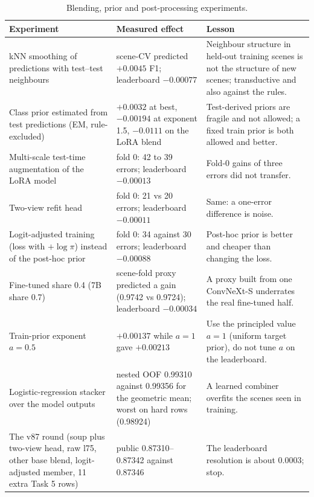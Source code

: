 \documentclass[../main.tex]{subfiles}
\begin{document}
\begin{table}[H]\centering\footnotesize
\begin{tabular}{@{}L{.22\linewidth}L{.36\linewidth}L{.34\linewidth}@{}}
\toprule
\textbf{Experiment} & \textbf{Measured effect} & \textbf{Lesson} \\
\midrule
kNN smoothing of predictions with test--test neighbours & scene-CV predicted $+0.0045$ F1; leaderboard $-0.00077$ & Neighbour structure in held-out training scenes is not the structure of new scenes; transductive and also against the rules. \\
Class prior estimated from test predictions (EM, rule-excluded) & $+0.0032$ at best, $-0.00194$ at exponent 1.5, $-0.0111$ on the LoRA blend & Test-derived priors are fragile and not allowed; a fixed train prior is both allowed and better. \\
Multi-scale test-time augmentation of the LoRA model & fold 0: 42 to 39 errors; leaderboard $-0.00013$ & Fold-0 gains of three errors did not transfer. \\
Two-view refit head & fold 0: 21 vs 20 errors; leaderboard $-0.00011$ & Same: a one-error difference is noise. \\
Logit-adjusted training (loss with $+\log\pi$) instead of the post-hoc prior & fold 0: 34 against 30 errors; leaderboard $-0.00088$ & Post-hoc prior is better and cheaper than changing the loss. \\
Fine-tuned share 0.4 (7B share 0.7) & scene-fold proxy predicted a gain (0.9742 vs 0.9724); leaderboard $-0.00034$ & A proxy built from one ConvNeXt-S underrates the real fine-tuned half. \\
Train-prior exponent $a=0.5$ & $+0.00137$ while $a=1$ gave $+0.00213$ & Use the principled value $a=1$ (uniform target prior), do not tune $a$ on the leaderboard. \\
Logistic-regression stacker over the model outputs & nested OOF 0.99310 against 0.99356 for the geometric mean; worst on hard rows (0.98924) & A learned combiner overfits the scenes seen in training. \\
The v87 round (soup plus two-view head, raw l75, other base blend, logit-adjusted member, 11 extra Task 5 rows) & public 0.87310--0.87342 against 0.87346 & The leaderboard resolution is about 0.0003; stop. \\
\bottomrule
\end{tabular}
\caption{Blending, prior and post-processing experiments.}\label{tab:t4-fail-b}
\end{table}
\end{document}

